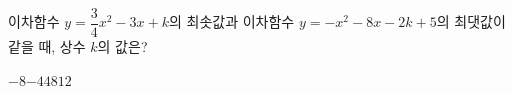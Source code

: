 \hspace*{2mm}\begin{minipage}[t]{\dimexpr\linewidth-2mm\relax}\vspace{0pt}
이차함수 $y=\dfrac{3}{4}x^2-3x+k$의 최솟값과 이차함수 $y=-x^2-8x-2k+5$의 최댓값이 같을 때, 상수 $k$의 값은?
\begin{choices32}{$-8$}{$-4$}{$4$}{$8$}{$12$}\end{choices32}\end{minipage}
